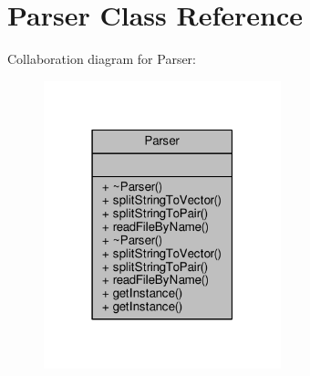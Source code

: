 \hypertarget{class_parser}{}\section{Parser Class Reference}
\label{class_parser}


Collaboration diagram for Parser\+:\nopagebreak
\begin{figure}[H]
\begin{center}
\leavevmode
\includegraphics[width=195pt]{d0/d5d/class_parser__coll__graph}
\end{center}
\end{figure}
